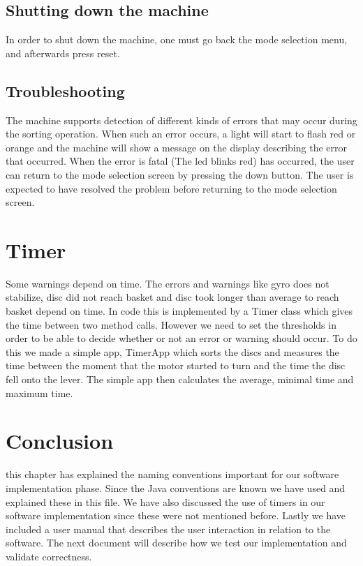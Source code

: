 \documentclass[a4paper,oneside,11pt]{article}
\begin{document}
\subsection{Shutting down the machine}
In order to shut down the machine, one must go back the mode selection menu, and afterwards press reset.

\subsection{Troubleshooting}
The machine supports detection of different kinds of errors that may occur during the sorting operation. When such an error occurs, a light will start to flash red or orange and the machine will show a message on the display describing the error that occurred. When the error is fatal (The led blinks red) has occurred, the user can return to the mode selection screen by pressing the down button. The user is expected to have resolved the problem before returning to the mode selection screen. 


\section{Timer}
Some warnings depend on time. The errors and warnings like gyro does not stabilize, disc did not reach basket and disc took longer than average to reach basket depend on time. In code this is implemented by a Timer class which gives the time between two method calls. However we need to set the thresholds in order to be able to decide whether or not an error or warning should occur. To do this we made a simple app, TimerApp which sorts the discs and measures the time between the moment that the motor started to turn and the time the disc fell onto the lever. The simple app then calculates the average, minimal time and maximum time.

\section{Conclusion}
this chapter has explained the naming conventions important for our software implementation phase. Since the Java conventions are known we have used and explained these in this file. We have also discussed the use of timers in our software implementation since these were not mentioned before. Lastly we have included a user manual that describes the user interaction in relation to the software. The next document will describe how we test our implementation and validate correctness.
\end{document}
